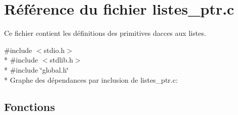 \hypertarget{a00024}{}\section{Référence du fichier listes\+\_\+ptr.\+c}
\label{a00024}


Ce fichier contient les définitions des primitives d\textquotesingle{}acces aux listes.  


{\ttfamily \#include $<$stdio.\+h$>$}\\*
{\ttfamily \#include $<$stdlib.\+h$>$}\\*
{\ttfamily \#include \char`\"{}global.\+h\char`\"{}}\\*
Graphe des dépendances par inclusion de listes\+\_\+ptr.\+c\+:
\subsection*{Fonctions}
